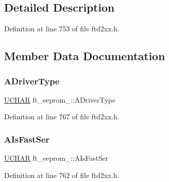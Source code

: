 \subsection{Detailed Description}


Definition at line 753 of file ftd2xx.\+h.



\subsection{Member Data Documentation}
\mbox{\label{structft__eeprom__2232_ad86a60a990160e5976e563365b7d05d0}} 
\subsubsection{\texorpdfstring{A\+Driver\+Type}{ADriverType}}
{\footnotesize\ttfamily \hyperlink{CatCaloProto40MHz_2inc_2WinTypes_8h_a4f4bb67531a9bf6f0b9c6ad76aeba587}{U\+C\+H\+AR} ft\+\_\+eeprom\+\_\+::\+A\+Driver\+Type}



Definition at line 767 of file ftd2xx.\+h.

\mbox{\label{structft__eeprom__2232_acbcbf6335afad8a22eac6a575f385785}} 
\subsubsection{\texorpdfstring{A\+Is\+Fast\+Ser}{AIsFastSer}}
{\footnotesize\ttfamily \hyperlink{CatCaloProto40MHz_2inc_2WinTypes_8h_a4f4bb67531a9bf6f0b9c6ad76aeba587}{U\+C\+H\+AR} ft\+\_\+eeprom\+\_\+::\+A\+Is\+Fast\+Ser}



Definition at line 762 of file ftd2xx.\+h.

\mbox{\label{structft__eeprom__2232_acf4ea789894df80107249291ac055a6f}} 
